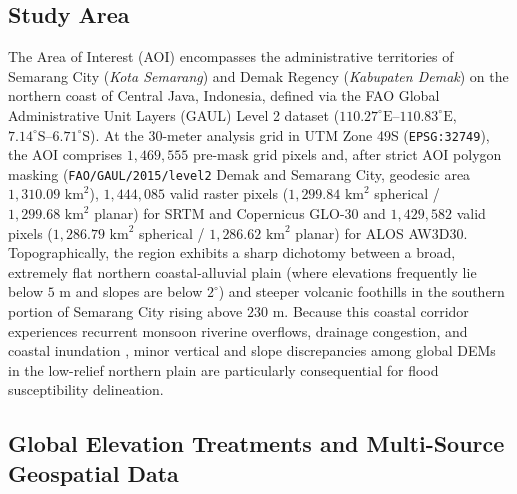 \documentclass[11pt,twoside]{article}
\begin{document}
\subsection{Study Area}\label{subsec:study-area}

The Area of Interest (AOI) encompasses the administrative territories of Semarang City (\emph{Kota Semarang}) and Demak Regency (\emph{Kabupaten Demak}) on the northern coast of Central Java, Indonesia, defined via the FAO Global Administrative Unit Layers (GAUL) Level 2 dataset ($110.27^\circ\text{E}\text{--}110.83^\circ\text{E}$, $7.14^\circ\text{S}\text{--}6.71^\circ\text{S}$). At the 30-meter analysis grid in UTM Zone 49S (\texttt{EPSG:32749}), the AOI comprises $1{,}469{,}555$ pre-mask grid pixels and, after strict AOI polygon masking (\texttt{FAO/GAUL/2015/level2} Demak and Semarang City, geodesic area $1{,}310.09\text{ km}^2$), $1{,}444{,}085$ valid raster pixels ($1{,}299.84\text{ km}^2$ spherical / $1{,}299.68\text{ km}^2$ planar) for SRTM and Copernicus GLO-30 and $1{,}429{,}582$ valid pixels ($1{,}286.79\text{ km}^2$ spherical / $1{,}286.62\text{ km}^2$ planar) for ALOS AW3D30. Topographically, the region exhibits a sharp dichotomy between a broad, extremely flat northern coastal-alluvial plain (where elevations frequently lie below $5\text{ m}$ and slopes are below $2^\circ$) and steeper volcanic foothills in the southern portion of Semarang City rising above $230\text{ m}$. Because this coastal corridor experiences recurrent monsoon riverine overflows, drainage congestion, and coastal inundation \cite{marfai2008,abidin2015,Husnayaen2018}, minor vertical and slope discrepancies among global DEMs in the low-relief northern plain are particularly consequential for flood susceptibility delineation.

\subsection{Global Elevation Treatments and Multi-Source Geospatial Data}\label{subsec:data-sources}
\end{document}
